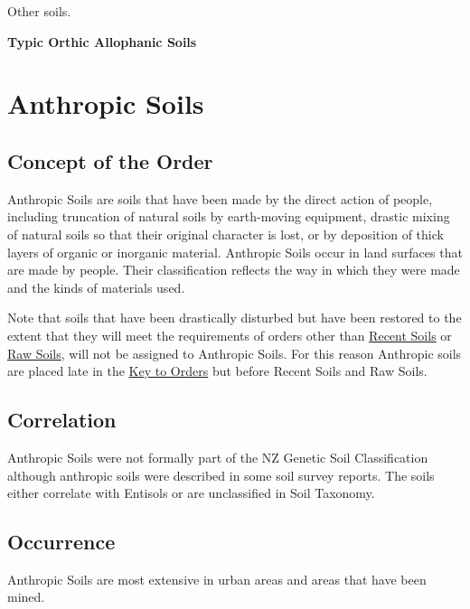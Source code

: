 \documentclass[
  letterpaper,
  DIV=11,
  numbers=noendperiod]{scrreprt}
\begin{document}
Other soils.

\textbf{Typic Orthic Allophanic Soils}


\hypertarget{sec-ord-A}{%
\chapter{Anthropic Soils}\label{sec-ord-A}}

\hypertarget{sec-con-A}{%
\section{Concept of the Order}\label{sec-con-A}}

Anthropic Soils are soils that have been made by the direct action of
people, including truncation of natural soils by earth-moving equipment,
drastic mixing of natural soils so that their original character is
lost, or by deposition of thick layers of organic or inorganic material.
Anthropic Soils occur in land surfaces that are made by people. Their
classification reflects the way in which they were made and the kinds of
materials used.

Note that soils that have been drastically disturbed but have been
restored to the extent that they will meet the requirements of orders
other than \protect\hyperlink{sec-R}{Recent Soils} or
\protect\hyperlink{sec-W}{Raw Soils}, will not be assigned to Anthropic
Soils. For this reason Anthropic soils are placed late in the
\protect\hyperlink{sec-key}{Key to Orders} but before Recent Soils and
Raw Soils.

\hypertarget{sec-cor-A}{%
\section{Correlation}\label{sec-cor-A}}

Anthropic Soils were not formally part of the NZ Genetic Soil
Classification although anthropic soils were described in some soil
survey reports. The soils either correlate with Entisols or are
unclassified in Soil Taxonomy.

\hypertarget{sec-occ-A}{%
\section{Occurrence}\label{sec-occ-A}}

Anthropic Soils are most extensive in urban areas and areas that have
been mined.
\end{document}

